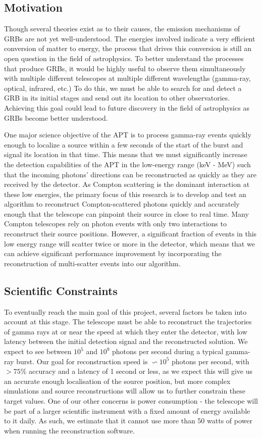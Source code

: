 \subsection{Motivation}
Though several theories exist as to their causes, the emission mechanisms of GRBs are not yet well-understood. The energies involved indicate a very efficient conversion of matter to energy, the process that drives this conversion is still an open question in the field of astrophysics. To better understand the processes that produce GRBs, it would be highly useful to observe them simultaneously with multiple different telescopes at multiple different wavelengths (gamma-ray, optical, infrared, etc.) To do this, we must be able to search for and detect a GRB in its initial stages and send out its location to other observatories. Achieving this goal could lead to future discovery in the field of astrophysics as GRBs become better understood.

One major science objective of the APT is to process gamma-ray events quickly enough to localize a source within a few seconds of the start of the burst and signal its location in that time. This means that we must significantly increase the detection capabilities of the APT in the low-energy range (keV - MeV) such that the incoming photons' directions can be reconstructed as quickly as they are received by the detector. As Compton scattering is the dominant interaction at these low energies, the primary focus of this research is to develop and test an algorithm to reconstruct Compton-scattered photons quickly and accurately enough that the telescope can pinpoint their source in close to real time. Many Compton telescopes rely on photon events with only two interactions to reconstruct their source positions. However, a significant fraction of events in this low energy range will scatter twice or more in the detector, which means that we can achieve significant performance improvement by incorporating the reconstruction of multi-scatter events into our algorithm.

\subsection{Scientific Constraints}

To eventually reach the main goal of this project, several factors be taken into account at this stage. The telescope must be able to reconstruct the trajectories of gamma rays at or near the speed at which they enter the detector, with low latency between the initial detection signal and the reconstructed solution. We expect to see between $10^5$ and $10^9$ photons per second during a typical gamma-ray burst\cite{UMD}. Our goal for reconstruction speed is $\backsim 10^5$ photons per second, with $>75\%$ accuracy and a latency of 1 second or less, as we expect this will give us an accurate enough localisation of the source position, but more complex simulations and source reconstructions will allow us to further constrain these target values. One of our other concerns is power consumption - the telescope will be part of a larger scientific instrument with a fixed amount of energy available to it daily. As such, we estimate that it cannot use more than 50 watts of power when running the reconstruction software.

